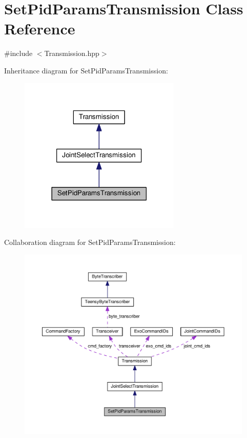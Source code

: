 \hypertarget{classSetPidParamsTransmission}{}\section{Set\+Pid\+Params\+Transmission Class Reference}
\label{classSetPidParamsTransmission}


{\ttfamily \#include $<$Transmission.\+hpp$>$}



Inheritance diagram for Set\+Pid\+Params\+Transmission\+:\nopagebreak
\begin{figure}[H]
\begin{center}
\leavevmode
\includegraphics[width=218pt]{classSetPidParamsTransmission__inherit__graph}
\end{center}
\end{figure}


Collaboration diagram for Set\+Pid\+Params\+Transmission\+:
\nopagebreak
\begin{figure}[H]
\begin{center}
\leavevmode
\includegraphics[width=350pt]{classSetPidParamsTransmission__coll__graph}
\end{center}
\end{figure}
